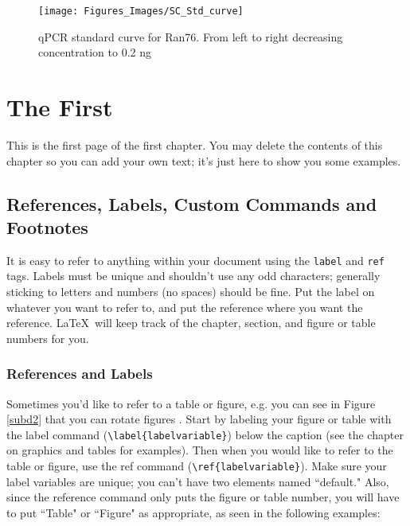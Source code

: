 \documentclass[12pt,twoside]{reedthesis}
\begin{document}
       		 
       		     		 \begin{figure}[h!tbp]
       		     		 	\centering
       		     		 	\texttt{[image: Figures\_Images/SC\_Std\_curve]}
       		     		 	\caption[qPCR Standard Curves for Ran76 Amplification]{qPCR standard curve for Ran76. From left to right decreasing concentration  to 0.2 ng}
       		     		 	\label{qPCRRan76Stdcurve}
       		     		 \end{figure}
           	
           		
    \chapter{The First}
    	This is the first page of the first chapter. You may delete the contents of this chapter so you can add your own text; it's just here to show you some examples. 
	
\section{References, Labels, Custom Commands and Footnotes}
It is easy to refer to anything within your document using the \texttt{label} and \texttt{ref} tags.  Labels must be unique and shouldn't use any odd characters; generally sticking to letters and numbers (no spaces) should be fine. Put the label on whatever you want to refer to, and put the reference where you want the reference. \LaTeX\ will keep track of the chapter, section, and figure or table numbers for you. 

\subsection{References and Labels}
Sometimes you'd like to refer to a table or figure, e.g. you can see in Figure \ref{subd2} that you can rotate figures . Start by labeling your figure or table with the label command (\verb=\label{labelvariable}=) below the caption (see the chapter on graphics and tables for examples). Then when you would like to refer to the table or figure, use the ref command (\verb=\ref{labelvariable}=). Make sure your label variables are unique; you can't have two elements named ``default." Also, since the reference command only puts the figure or table number, you will have to put  ``Table" or ``Figure" as appropriate, as seen in the following examples:
\end{document}
